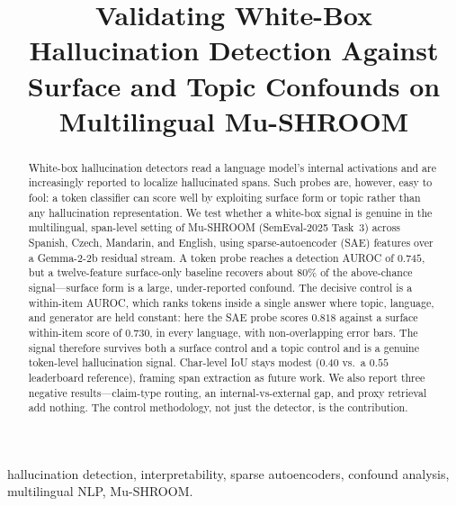 \documentclass[conference]{IEEEtran}
\begin{document}
\title{Validating White-Box Hallucination Detection Against\\
Surface and Topic Confounds on Multilingual Mu-SHROOM}

\author{
\and
{}
}

\maketitle

\begin{abstract}
White-box hallucination detectors read a language model's internal
activations and are increasingly reported to localize hallucinated spans.
Such probes are, however, easy to fool: a token classifier can score well by
exploiting surface form or topic rather than any hallucination
representation. We test whether a white-box signal is genuine in the
multilingual, span-level setting of Mu-SHROOM (SemEval-2025 Task~3) across
Spanish, Czech, Mandarin, and English, using sparse-autoencoder (SAE)
features over a Gemma-2-2b residual stream. A token probe reaches a
detection AUROC of $0.745$, but a twelve-feature surface-only baseline
recovers about $80\%$ of the above-chance signal---surface form is a large,
under-reported confound. The decisive control is a within-item AUROC, which
ranks tokens inside a single answer where topic, language, and generator are
held constant: here the SAE probe scores $0.818$ against a surface within-item
score of $0.730$, in every language, with non-overlapping error bars. The
signal therefore survives both a surface control and a topic control and is a
genuine token-level hallucination signal. Char-level IoU stays modest
($0.40$ vs.\ a $0.55$ leaderboard reference), framing span extraction as
future work. We also report three negative results---claim-type routing, an
internal-vs-external gap, and proxy retrieval add nothing. The control
methodology, not just the detector, is the contribution.
\end{abstract}

\begin{IEEEkeywords}
hallucination detection, interpretability, sparse autoencoders, confound
analysis, multilingual NLP, Mu-SHROOM.
\end{IEEEkeywords}
\end{document}

